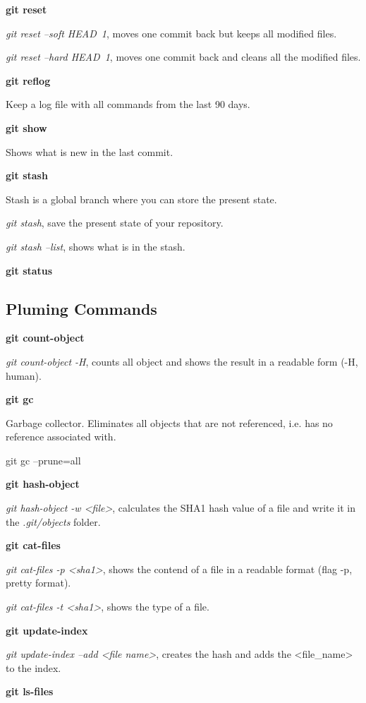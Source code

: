 \noindent \textbf{git reset}

\emph{git reset --soft HEAD~1}, moves one commit back but keeps all modified files.

\emph{git reset --hard HEAD~1}, moves one commit back and cleans all the modified files.

\textbf{git reflog}

Keep a log file with all commands from the last 90 days.

\textbf{git show}

Shows what is new in the last commit.

\noindent \textbf{git stash}

Stash is a global branch where you can store the present state.

\emph{git stash}, save the present state of your repository.

\emph{git stash --list}, shows what is in the stash.

\textbf{git status}

\subsection{Pluming Commands}

\noindent \textbf{git count-object}

\emph{git count-object -H}, counts all object and shows the result in a readable form (-H, human).

\textbf{git gc}

Garbage collector.
Eliminates all objects that are not referenced, i.e. has no reference associated with.

git gc --prune=all


\noindent \textbf{git hash-object}

\emph{git hash-object -w <file>}, calculates the SHA1 hash value of a file and write it in the \emph{.git/objects} folder.

\noindent \textbf{git cat-files}

\emph{git cat-files -p <sha1>}, shows the contend of a file in a readable format (flag -p, pretty format).

\emph{git cat-files -t <sha1>}, shows the type of a file.

\noindent \textbf{git update-index}

\emph{git update-index --add <file name>}, creates the hash and adds the <file\_name> to the index.

\noindent \textbf{git ls-files}

